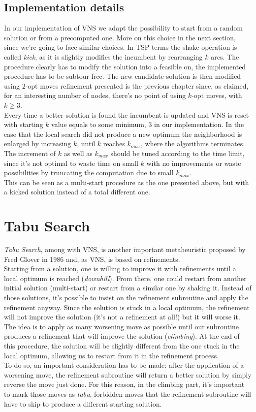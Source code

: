 \subsection{Implementation details}
In our implementation of VNS we adapt the possibility to start from a random
solution or from a precomputed one. More on this choice in the next section,
since we're going to face similar choices. In TSP terms the shake operation is
called \emph{kick}, as it is slightly modifies the incumbent by rearranging $k$
arcs. The procedure clearly has to modify the solution into a feasible on, the
implemented procedure has to be subtour-free. The new candidate solution is then
modified using $2$-opt moves refinement presented is the previous chapter since,
as claimed, for an interesting number of nodes, there's no point of using
$k$-opt moves, with $k \ge 3$.\\ 
Every time a better solution is found the incumbent is updated and VNS is reset
with starting $k$ value equals to some minimum, 3 in our implementation. In the
case that the local search did not produce a new optimum the neighborhood is
enlarged by increasing $k$, until $k$ reaches $k_{max}$, where the algorithms
terminates. The increment of $k$ as well as $k_{max}$ should be tuned according
to the time limit, since it's not optimal to waste time on small $k$ with no
improvements or waste possibilities by truncating the computation due to small
$k_{max}$.\\
This can be seen as a multi-start procedure as the one presented above, but with
a kicked solution instead of a total different one.


\section{Tabu Search}
\emph{Tabu Search}, among with VNS, is another important metaheuristic proposed
by Fred Glover in 1986\citep{glover1986future} and, as VNS, is based on
refinements.\\ Starting from a solution, one is willing to improve it with
refinements until a local optimum is reached (\emph{downhill}). From there, one
could restart from another initial solution (multi-start) or restart from a
similar one by shaking it. Instead of those solutions, it's possible to insist
on the refinement subroutine and apply the refinement anyway. Since the solution
is stuck in a local optimum, the refinement will not improve the solution (it's
not a refinement at all!) but it will worse it. The idea is to apply as many
worsening move as possible until our subroutine produces a refinement that will
improve the solution (\emph{climbing}). At the end of this procedure, the
solution will be slightly different from the one stuck in the local optimum,
allowing us to restart from it in the refinement process.\\ To do so, an
important consideration has to be made: after the application of a worsening
move, the refinement subroutine will return a better solution by simply reverse
the move just done. For this reason, in the climbing part, it's important to
mark those moves as \emph{tabu}, forbidden moves that the refinement subroutine
will have to skip to produce a different starting solution.\\


